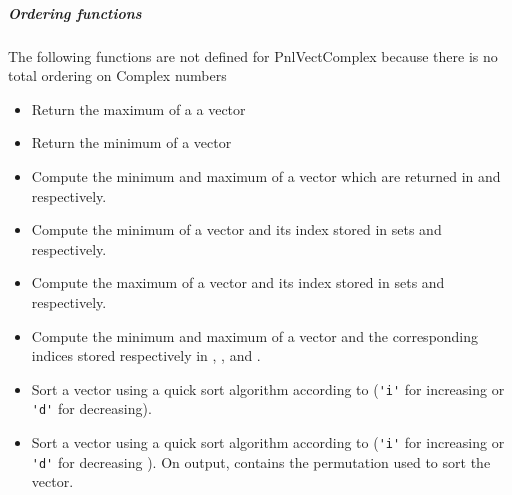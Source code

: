 \subparagraph{Ordering functions}
The following functions are not defined for PnlVectComplex because there is
no total ordering on Complex numbers

\begin{itemize}
\item {}
  \sshortdescribe Return the maximum of a a vector  

\item {}
  \sshortdescribe Return the minimum of a vector  

\item {}
  \sshortdescribe Compute the minimum and maximum of a vector which are
  returned in   and  respectively.
  
\item {}
  \sshortdescribe Compute the minimum of a vector and its index stored in 
  sets  and  respectively.

\item {}
  \sshortdescribe Compute the maximum of a vector and its index stored in 
  sets  and  respectively.

\item {}
  \sshortdescribe Compute the minimum and maximum of a vector and the
  corresponding indices stored respectively in , ,  and
  .

\item {}
  \sshortdescribe Sort a vector using a quick sort algorithm according to
   (\verb!'i'! for increasing or \verb!'d'! for decreasing).

\item {}
  \sshortdescribe Sort a vector using a quick sort algorithm according to
   (\verb!'i'! for increasing or \verb!'d'! for decreasing ). On
  output,  contains the permutation used to sort the vector.


\end{itemize}
